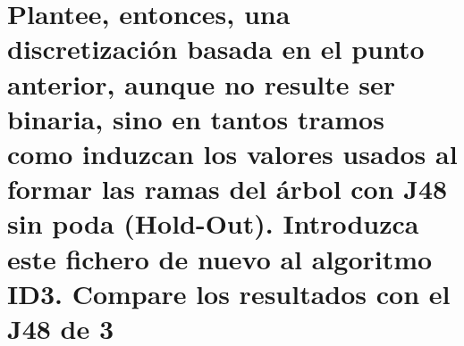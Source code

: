 \documentclass[10pt, a4paper,spanish]{article}
\begin{document}
		\paragraph{}


	\section{Plantee, entonces, una discretización basada en el punto anterior, aunque no resulte ser binaria, sino en tantos tramos como induzcan los valores usados al formar las ramas del árbol con J48 sin poda (Hold-Out). Introduzca este fichero de nuevo al algoritmo ID3. Compare los resultados con el J48 de 3}

		\paragraph{}



	\nocite{subject:taa}
  
  
\end{document}
